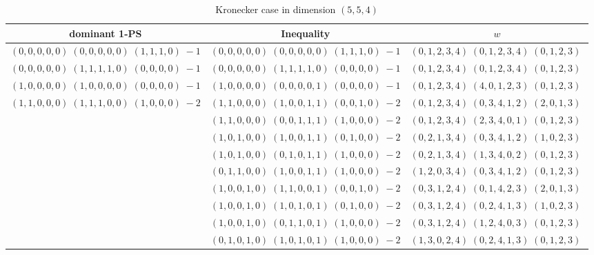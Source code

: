 \documentclass[11pt]{article}
\begin{document}
 
 \begin{longtable}[l]{|c|c|c|} 
 \caption{Kronecker case in dimension $(5,5,4)$} \\  
 
 \hline 
 \textrm{dominant 1-PS} & \textrm{Inequality} & $w$ \\ 
 \hline\multirow[t]{1}{*}{ $(0 ,0 ,0 ,0 ,0) \;(0 ,0 ,0 ,0 ,0) \;(1 ,1 ,1 ,0) \;-1$ }  & $(0 ,0 ,0 ,0 ,0) \;(0 ,0 ,0 ,0 ,0) \;(1 ,1 ,1 ,0) \;-1$ & $(0 ,1 ,2 ,3 ,4) \;(0 ,1 ,2 ,3 ,4) \;(0 ,1 ,2 ,3) \;$\\ \hline\multirow[t]{1}{*}{ $(0 ,0 ,0 ,0 ,0) \;(1 ,1 ,1 ,1 ,0) \;(0 ,0 ,0 ,0) \;-1$ }  & $(0 ,0 ,0 ,0 ,0) \;(1 ,1 ,1 ,1 ,0) \;(0 ,0 ,0 ,0) \;-1$ & $(0 ,1 ,2 ,3 ,4) \;(0 ,1 ,2 ,3 ,4) \;(0 ,1 ,2 ,3) \;$\\ \hline\multirow[t]{1}{*}{ $(1 ,0 ,0 ,0 ,0) \;(1 ,0 ,0 ,0 ,0) \;(0 ,0 ,0 ,0) \;-1$ }  & $(1 ,0 ,0 ,0 ,0) \;(0 ,0 ,0 ,0 ,1) \;(0 ,0 ,0 ,0) \;-1$ & $(0 ,1 ,2 ,3 ,4) \;(4 ,0 ,1 ,2 ,3) \;(0 ,1 ,2 ,3) \;$\\ \hline\multirow[t]{17}{*}{ $(1 ,1 ,0 ,0 ,0) \;(1 ,1 ,1 ,0 ,0) \;(1 ,0 ,0 ,0) \;-2$ }  & $(1 ,1 ,0 ,0 ,0) \;(1 ,0 ,0 ,1 ,1) \;(0 ,0 ,1 ,0) \;-2$ & $(0 ,1 ,2 ,3 ,4) \;(0 ,3 ,4 ,1 ,2) \;(2 ,0 ,1 ,3) \;$\\ 
 \cline{2-3} 
 & $(1 ,1 ,0 ,0 ,0) \;(0 ,0 ,1 ,1 ,1) \;(1 ,0 ,0 ,0) \;-2$ & $(0 ,1 ,2 ,3 ,4) \;(2 ,3 ,4 ,0 ,1) \;(0 ,1 ,2 ,3) \;$\\ 
 \cline{2-3} 
 & $(1 ,0 ,1 ,0 ,0) \;(1 ,0 ,0 ,1 ,1) \;(0 ,1 ,0 ,0) \;-2$ & $(0 ,2 ,1 ,3 ,4) \;(0 ,3 ,4 ,1 ,2) \;(1 ,0 ,2 ,3) \;$\\ 
 \cline{2-3} 
 & $(1 ,0 ,1 ,0 ,0) \;(0 ,1 ,0 ,1 ,1) \;(1 ,0 ,0 ,0) \;-2$ & $(0 ,2 ,1 ,3 ,4) \;(1 ,3 ,4 ,0 ,2) \;(0 ,1 ,2 ,3) \;$\\ 
 \cline{2-3} 
 & $(0 ,1 ,1 ,0 ,0) \;(1 ,0 ,0 ,1 ,1) \;(1 ,0 ,0 ,0) \;-2$ & $(1 ,2 ,0 ,3 ,4) \;(0 ,3 ,4 ,1 ,2) \;(0 ,1 ,2 ,3) \;$\\ 
 \cline{2-3} 
 & $(1 ,0 ,0 ,1 ,0) \;(1 ,1 ,0 ,0 ,1) \;(0 ,0 ,1 ,0) \;-2$ & $(0 ,3 ,1 ,2 ,4) \;(0 ,1 ,4 ,2 ,3) \;(2 ,0 ,1 ,3) \;$\\ 
 \cline{2-3} 
 & $(1 ,0 ,0 ,1 ,0) \;(1 ,0 ,1 ,0 ,1) \;(0 ,1 ,0 ,0) \;-2$ & $(0 ,3 ,1 ,2 ,4) \;(0 ,2 ,4 ,1 ,3) \;(1 ,0 ,2 ,3) \;$\\ 
 \cline{2-3} 
 & $(1 ,0 ,0 ,1 ,0) \;(0 ,1 ,1 ,0 ,1) \;(1 ,0 ,0 ,0) \;-2$ & $(0 ,3 ,1 ,2 ,4) \;(1 ,2 ,4 ,0 ,3) \;(0 ,1 ,2 ,3) \;$\\ 
 \cline{2-3} 
 & $(0 ,1 ,0 ,1 ,0) \;(1 ,0 ,1 ,0 ,1) \;(1 ,0 ,0 ,0) \;-2$ & $(1 ,3 ,0 ,2 ,4) \;(0 ,2 ,4 ,1 ,3) \;(0 ,1 ,2 ,3) \;$\\ 

\end{longtable}
\end{document}
